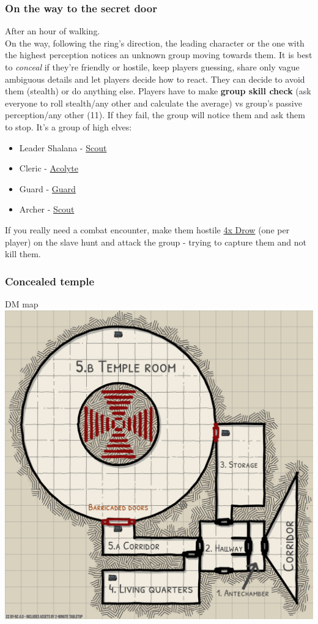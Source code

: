 \documentclass[10pt,onecolumn,twoside,openany,bg=full,layout=true]{dndbook}
\begin{document}
\subsubsection{On the way to the secret door}
After an hour of walking.\\
On the way, following the ring's direction, the leading character
or the one with the highest perception notices an unknown group moving towards them.
It is best to \emph{conceal} if they're friendly or hostile, keep players guessing, share only vague ambiguous details and let players decide how to react.
They can decide to avoid them (stealth) or do anything else.
Players have to make \textbf{group skill check} (ask everyone to roll stealth/any other and calculate the average) vs group's passive perception/any other (11).
If they fail, the group will notice them and ask them to stop.
It's a group of high elves:
\begin{itemize}
  \item Leader Shalana - \href{https://www.dndbeyond.com/monsters/17007-scout}{Scout}
  \item Cleric - \href{https://www.dndbeyond.com/monsters/16763-acolyte}{Acolyte}
  \item Guard - \href{https://www.dndbeyond.com/monsters/16915-guard}{Guard}
  \item Archer - \href{https://www.dndbeyond.com/monsters/17007-scout}{Scout}
\end{itemize}

If you really need a combat encounter, make them hostile \href{https://www.dndbeyond.com/monsters/17133-drow}{4x Drow}
(one per player) on the slave hunt and attack the group - trying to capture them and not kill them.

\subsubsection{Concealed temple}
DM map
\includegraphics[width=1\textwidth]{img/maps/dm_ruined_temple_map_19x19}
\end{document}
